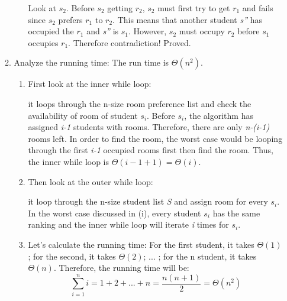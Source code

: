 \documentclass{homework}
\begin{document}
\begin{enumerate}
\begin{enumerate}
\begin{enumerate}
            Look at \textit{$s_2$}. Before \textit{$s_2$} getting \textit{$r_2$}, \textit{$s_2$} must first try to get \textit{$r_1$} and fails since \textit{$s_2$} prefers \textit{$r_1$} to \textit{$r_2$}. This means that another student \textit{s''} has occupied the \textit{$r_1$} and \textit{s''} is \textit{$s_1$}. However, \textit{$s_2$} must occupy \textit{$r_2$} before \textit{$s_1$} occupies \textit{$r_1$}. Therefore contradiction! Proved.

        \end{enumerate}
        

        \item Analyze the running time:
        The run time is $\Theta(n^2)$.
        \begin{enumerate}
            \item First look at the inner while loop:

            it loops through the n-size room preference list and check the availability of room of student \textit{$s_i$}. Before \textit{$s_i$}, the algorithm has assigned \textit{i-1} students with rooms. Therefore, there are only \textit{n-(i-1)} rooms left. In order to find the room, the worst case would be looping through the first \textit{i-1} occupied rooms first then find the room. Thus, the inner while loop is $\Theta(i-1+1) = \Theta(i)$.

            \item Then look at the outer while loop:

            it loop through the n-size student list \textit{S} and assign room for every \textit{$s_i$}. In the worst case discussed in (i), every student \textit{$s_i$} has the same ranking and the inner while loop will iterate \textit{i} times for \textit{$s_i$}. 

            \item Let's calculate the running time:
            For the first student, it takes $\Theta(1)$; for the second, it takes $\Theta(2)$; ... ; for the n student, it takes $\Theta(n)$. Therefore, the running time will be:
            \[ \sum_{i=1}^{n} i = 1 + 2 + ... + n = \dfrac{n(n+1)}{2} = \Theta(n^2) \]
            
            
            
        \end{enumerate}
    \end{enumerate}
\end{enumerate}
\end{document}
